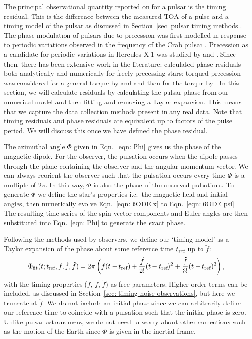 \documentclass[../full_thesis/full_thesis.tex]{subfiles}
\begin{document}
The principal observational quantity reported on for a pulsar is the timing
residual. This is the difference between the measured TOA of a pulse and a
timing model of the pulsar as discussed in Section~\ref{sec: pulsar timing
methods}.  The phase modulation of pulsars due to precession was first modelled
in response to periodic variations observed in the frequency of the Crab pulsar
\citep{Ruderman1970, chiuderi1970shape}. Precession as a candidate for periodic
variations in Hercules X-1 was studied by \citet{bisnovatyi1990model} and
\citet{bisnovatyi1993period}. Since then, there has been extensive work in the
literature: \citet{Nelson1990} calculated phase residuals both analytically and
numerically for freely precessing stars; torqued precession was considered for
a general torque by \citet{Jones1988excitation} and \citet{Cordes1993} and then
for the \citet{Deutsch1955} torque by \citet{Melatos1999, Melatos2000}.  In
this section, we will calculate residuals by calculating the pulsar phase from
our numerical model and then fitting and removing a Taylor expansion. This
means that we capture the data collection methods present in any real data.
Note that timing residuals and phase residuals are equivalent up to factors of the
pulse period. We will discuss this once we have defined the phase
residual.

The azimuthal angle $\Phi$ given in Eqn.~\eqref{eqn: Phi} gives us the phase of
the magnetic dipole. For the observer, the pulsation occurs when the dipole
passes through the plane containing the observer and the angular momentum
vector.  We can always reorient the observer such that the pulsation occurs
every time $\Phi$ is a multiple of $2\pi$. In this way, $\Phi$ is also the
phase of the observed pulsations. To generate $\Phi$ we define the star's
properties i.e.\ the magnetic field and initial angles, then numerically evolve
Eqn.~\eqref{eqn: 6ODE x} to Eqn.~\eqref{eqn: 6ODE psi}. The resulting time
series of the spin-vector components and Euler angles are then substituted into
Eqn.~\eqref{eqn: Phi} to generate the exact phase.

Following the methods used by observers, we define our `timing model' as
a Taylor expansion of the phase about some reference time $t_{\textrm{ref}}$ up to $\ddot{f}$:
\begin{equation}
    \Phi_{\mathrm{fit}}(t; t_{\textrm{ref}}, f, \dot{f}, \ddot{f}) =
    2\pi \left(f(t - t_{\textrm{ref}}) +
                          \frac{\dot{f}}{2!}(t-t_{\textrm{ref}})^{2} +
                          \frac{\ddot{f}}{3!}(t-t_{\textrm{ref}})^{3}
                          \right),
\label{eqn: TR taylor expansion}
\end{equation}
with the timing properties ($f$, $\dot{f}$, $\ddot{f}$) as free parameters.
Higher order terms can be included, as discussed in Section~\ref{sec: timing noise
observations}, but here we truncate at $\ddot{f}$. We do not include an initial
phase since we can arbitrarily define our reference time to coincide with a
pulsation such that the initial phase is zero.  Unlike pulsar astronomers, we
do not need to worry about other corrections such as the motion of the Earth
since $\Phi$ is given in the inertial frame.
\end{document}
